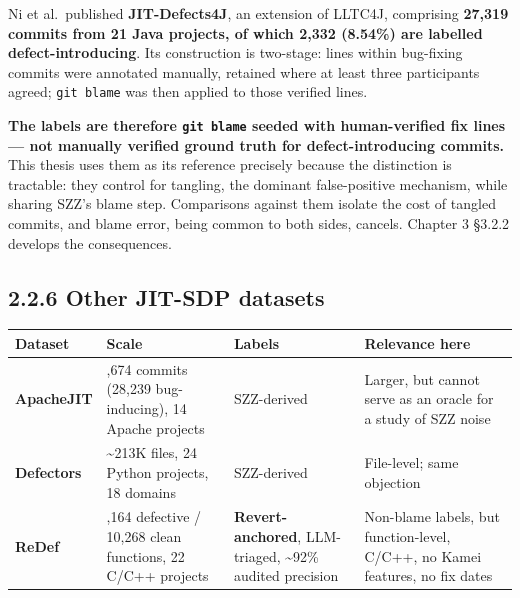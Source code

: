 Ni et al.~published \textbf{JIT-Defects4J}, an extension of LLTC4J,
comprising \textbf{27,319 commits from 21 Java projects, of which 2,332
(8.54\%) are labelled defect-introducing}. Its construction is
two-stage: lines within bug-fixing commits were annotated manually,
retained where at least three participants agreed; \texttt{git\ blame}
was then applied to those verified lines.

\textbf{The labels are therefore \texttt{git\ blame} seeded with
human-verified fix lines --- not manually verified ground truth for
defect-introducing commits.} This thesis uses them as its reference
precisely because the distinction is tractable: they control for
tangling, the dominant false-positive mechanism, while sharing SZZ's
blame step. Comparisons against them isolate the cost of tangled
commits, and blame error, being common to both sides, cancels. Chapter 3
\S{}3.2.2 develops the consequences.

\subsection{2.2.6 Other JIT-SDP datasets}\label{other-jit-sdp-datasets}

\begin{longtable}[]{@{}
  >{\raggedright\arraybackslash}p{}
  >{\raggedright\arraybackslash}p{}
  >{\raggedright\arraybackslash}p{}
  >{\raggedright\arraybackslash}p{}@{}}
\toprule\noalign{}
\begin{minipage}[b]{\linewidth}\raggedright
Dataset
\end{minipage} & \begin{minipage}[b]{\linewidth}\raggedright
Scale
\end{minipage} & \begin{minipage}[b]{\linewidth}\raggedright
Labels
\end{minipage} & \begin{minipage}[b]{\linewidth}\raggedright
Relevance here
\end{minipage} \\
\midrule\noalign{}
\endhead
\bottomrule\noalign{}
\endlastfoot
\textbf{ApacheJIT} & 106,674 commits (28,239 bug-inducing), 14 Apache
projects & SZZ-derived & Larger, but cannot serve as an oracle for a
study of SZZ noise \\
\textbf{Defectors} & \textasciitilde213K files, 24 Python projects, 18
domains & SZZ-derived & File-level; same objection \\
\textbf{ReDef} & 3,164 defective / 10,268 clean functions, 22 C/C++
projects & \textbf{Revert-anchored}, LLM-triaged, \textasciitilde92\%
audited precision & Non-blame labels, but function-level, C/C++, no
Kamei features, no fix dates \\
\end{longtable}

